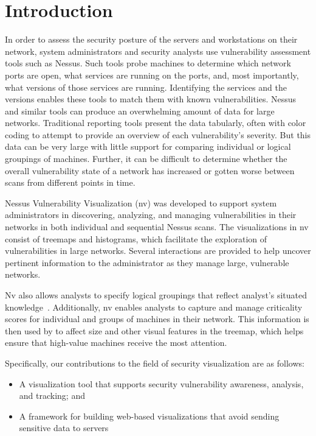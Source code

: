 \documentclass{acm_proc_article-sp}
\begin{document}
\section{Introduction}
In order to assess the security posture of the servers and workstations on their network, system administrators and security analysts use vulnerability assessment tools such as Nessus. 
Such tools probe machines to determine which network ports are open, what services are running on the ports, and, most importantly, what versions of those services are running. 
Identifying the services and the versions enables these tools to match them with known vulnerabilities. 
Nessus and similar tools can produce an overwhelming amount of data for large networks. 
Traditional reporting tools present the data tabularly, often with color coding to attempt to provide an overview of each vulnerability's severity. 
But this data can be very large with little support for comparing individual or logical groupings of machines. 
Further, it can be difficult to determine whether the overall vulnerability state of a network has increased or gotten worse between scans from different points in time.

Nessus Vulnerability Visualization (nv) was developed to support system administrators in discovering, analyzing, and managing vulnerabilities in their networks in both individual and sequential Nessus scans. The visualizations in nv consist of treemaps and histograms, which facilitate the exploration of vulnerabilities in large networks. Several interactions are provided to help uncover pertinent information to the administrator as they manage large, vulnerable networks.

Nv also allows analysts to specify logical groupings that reflect analyst's situated knowledge~\cite{Goodall:2004}. Additionally, nv enables analysts to capture and manage criticality scores for individual and groups of machines in their network. This information is then used by to affect size and other visual features in the treemap, which helps ensure that high-value machines receive the most attention.

Specifically, our contributions to the field of security visualization are as follows:

\begin{itemize}
  \item A visualization tool that supports security vulnerability awareness, analysis, and tracking; and
  \item A framework for building web-based visualizations that avoid sending sensitive data to servers
\end{itemize}
\end{document}
